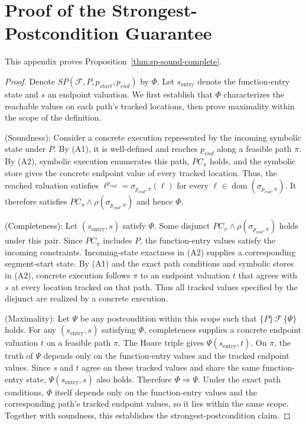 \section{Proof of the Strongest-Postcondition Guarantee}
\label{app:sp-proof}

{This appendix proves Proposition~\ref{thm:sp-sound-complete}.}

{
\begin{proof}
Denote $\textit{SP}(\mathcal{F},P,p_{\textit{start}},p_{\textit{end}})$ by $\Phi$. Let $s_{\mathrm{entry}}$ denote the function-entry state and $s$ an endpoint valuation. We first establish that $\Phi$ characterizes the reachable values on each path's tracked locations, then prove maximality within the scope of the definition.

(Soundness): Consider a concrete execution represented by the incoming symbolic state under $P$. By (A1), it is well-defined and reaches $p_{\textit{end}}$ along a feasible path $\pi$. By (A2), symbolic execution enumerates this path, $PC_\pi$ holds, and the symbolic store gives the concrete endpoint value of every tracked location. Thus, the reached valuation satisfies $\ell^{p_{\textit{end}}}=\sigma_{p_{\textit{end}},\pi}(\ell)$ for every $\ell\in\operatorname{dom}(\sigma_{p_{\textit{end}},\pi})$. It therefore satisfies $PC_\pi\land\rho(\sigma_{p_{\textit{end}},\pi})$ and hence $\Phi$.

(Completeness): Let $(s_{\mathrm{entry}},s)$ satisfy $\Phi$. Some disjunct $PC_\pi\land\rho(\sigma_{p_{\textit{end}},\pi})$ holds under this pair. Since $PC_\pi$ includes $P$, the function-entry values satisfy the incoming constraints. Incoming-state exactness in (A2) supplies a corresponding segment-start state. By (A1) and the exact path conditions and symbolic stores in (A2), concrete execution follows $\pi$ to an endpoint valuation $t$ that agrees with $s$ at every location tracked on that path. Thus all tracked values specified by the disjunct are realized by a concrete execution.

(Maximality): Let $\Psi$ be any postcondition within this scope such that $\{P\}\,\mathcal{F}\,\{\Psi\}$ holds. For any $(s_{\mathrm{entry}},s)$ satisfying $\Phi$, completeness supplies a concrete endpoint valuation $t$ on a feasible path $\pi$. The Hoare triple gives $\Psi(s_{\mathrm{entry}},t)$. On $\pi$, the truth of $\Psi$ depends only on the function-entry values and the tracked endpoint values. Since $s$ and $t$ agree on these tracked values and share the same function-entry state, $\Psi(s_{\mathrm{entry}},s)$ also holds. Therefore $\Phi\Rightarrow\Psi$. Under the exact path conditions, $\Phi$ itself depends only on the function-entry values and the corresponding path's tracked endpoint values, so it lies within the same scope. Together with soundness, this establishes the strongest-postcondition claim.
\end{proof}
}
